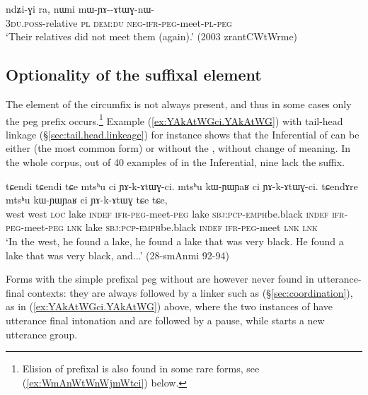\begin{exe}
\ex \label{ex:mWYAkAtWGnWci}
\gll  ndʑi-ɣi ra, nɯni mɯ-ɲɤ--ɤtɯɣ-nɯ- \\
\textsc{3du}.\textsc{poss}-relative \textsc{pl} \textsc{dem}:\textsc{du} \textsc{neg}-\textsc{ifr}-\textsc{peg}-meet-\textsc{pl}-\textsc{peg} \\
\glt `Their relatives did not meet them (again).' (2003 zrantCWtWrme)
\end{exe}


\subsection{Optionality of the suffixal element} \label{sec:peg.circumfix.optionality}
The  element of the circumfix is not always present, and thus in some cases only the peg prefix  occurs.\footnote{
Elision of prefixal  is also found in some rare forms, see (\ref{ex:WmAnWtWnWjmWtci}) below. 
} Example (\ref{ex:YAkAtWGci.YAkAtWG}) with tail-head linkage (§\ref{sec:tail.head.linkeage}) for instance shows that the Inferential of  can be either  (the most common form) or  without the , without change of meaning.  In the whole corpus, out of 40 examples of  in the Inferential, nine lack the  suffix.

\begin{exe}
	\ex \label{ex:YAkAtWGci.YAkAtWG}
	\gll  tɕendi tɕendi tɕe mtsʰu ci ɲɤ-k-ɤtɯɣ-ci. mtsʰu kɯ-ɲɯ\redp{}ɲaʁ ci ɲɤ-k-ɤtɯɣ-ci. tɕendɤre mtsʰu kɯ-ɲɯ\redp{}ɲaʁ ci ɲɤ-k-ɤtɯɣ tɕe tɕe, \\
	west west \textsc{loc}  lake \textsc{indef} \textsc{ifr}-\textsc{peg}-meet-\textsc{peg}  lake \textsc{sbj}:\textsc{pcp}-\textsc{emph}\redp{}be.black \textsc{indef} \textsc{ifr}-\textsc{peg}-meet-\textsc{peg} \textsc{lnk} lake \textsc{sbj}:\textsc{pcp}-\textsc{emph}\redp{}be.black \textsc{indef} \textsc{ifr}-\textsc{peg}-meet \textsc{lnk} \textsc{lnk} \\
	\glt `In the west, he found a lake, he found a lake that was very black. He found a lake that was very black, and...' (28-smAnmi 92-94) 
\end{exe}

Forms with the simple prefixal peg  without  are however never found in utterance-final contexts: they are always followed by a linker such as  (§\ref{sec:coordination}), as in (\ref{ex:YAkAtWGci.YAkAtWG}) above, where the two instances of  have utterance final intonation and are followed by a pause, while  starts a new utterance group. 


